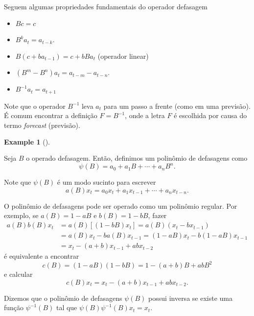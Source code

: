 \documentclass[
  letterpaper,
  DIV=11,
  numbers=noendperiod]{scrreprt}
\providecommand{\tightlist}{%
  \setlength{\itemsep}{0pt}\setlength{\parskip}{0pt}}\usepackage{longtable,booktabs,array}
\theoremstyle{definition}
\newtheorem{example}{Example}[chapter]
\theoremstyle{plain}
\theoremstyle{definition}
\theoremstyle{plain}
\theoremstyle{remark}
\begin{document}
Seguem algumas propriedades fundamentais do operador defasagem

\begin{itemize}
\tightlist
\item
  \(Bc=c\)
\item
  \(B^k a_t=a_{t-k}\).
\item
  \(B(c+ba_{t-1})=c+bBa_t\) (operador linear)
\item
  \((B^m - B^n)a_t = a_{t-m}-a_{t-n}.\)
\item
  \(B^{-1}a_t = a_{t+1}\)
\end{itemize}

Note que o operador \(B^{-1}\) leva \(a_t\) para um passo a frente (como
em uma previsão). É comum encontrar a definição \(F=B^{-1}\), onde a
letra \(F\) é escolhida por causa do termo \textit{forecast} (previsão).

\begin{example}[]\protect\hypertarget{exm-}{}\label{exm-}

Seja \(B\) o operado defasagem. Então, definimos um polinômio de
defasagens como \[\psi(B)=a_0+a_1B+\cdots+a_n B^n.\]

\end{example}

Note que \(\psi(B)\) é um modo sucinto para escrever
\[a(B)x_t=a_0x_t+a_1x_{t-1}+\cdots+a_n x_{t-n}.\]

O polinômio de defasagens pode ser operado como um polinômio regular.
Por exemplo, se \(a(B)=1-aB\) e \(b(B)=1-bB\), fazer \[\begin{align}
a(B)b(B)x_t&=a(B)[(1-bB)x_t]=a(B)(x_t-bx_{t-1})\\
&=a(B)x_t-ba(B)x_{t-1}=(1-aB)x_t-b(1-aB)x_{t-1}\\
&=x_t-(a+b)x_{t-1}+abx_{t-2}\end{align}\] é equivalente a encontrar
\[c(B)=(1-aB)(1-bB)=1-(a+b)B + abB^2\] e calcular
\[c(B)x_t=x_t-(a+b)x_{t-1}+abx_{t-2}.\]

Dizemos que o polinômio de defasagens \(\psi(B)\) possui inversa se
existe uma função \(\psi^{-1}(B)\) tal que
\(\psi(B)\psi^{-1}(B)x_t=x_t\).
\end{document}
